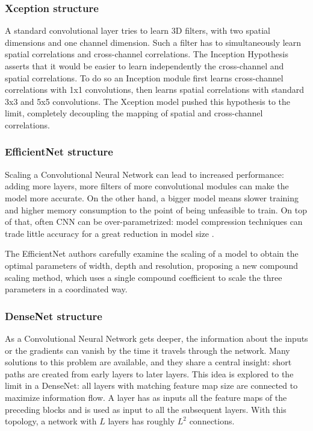 \subsubsection{Xception structure}

A standard convolutional layer tries to learn 3D filters, with two spatial
dimensions and one channel dimension.
Such a filter has to simultaneously learn spatial correlations and
cross-channel correlations.
The Inception Hypothesis asserts that it would be easier to learn independently
the cross-channel and spatial correlations.
To do so an Inception module first learns cross-channel correlations with 1x1
convolutions, then learns spatial correlations with standard 3x3 and 5x5
convolutions.
The Xception model pushed this hypothesis to the limit, completely decoupling
the mapping of spatial and cross-channel correlations.

\subsubsection{EfficientNet structure}

Scaling a Convolutional Neural Network can lead to increased performance:
adding more layers, more filters of more convolutional modules can make the
model more accurate. On the other hand, a bigger model means slower training
and higher memory consumption to the point of being unfeasible to train.
On top of that, often CNN can be over-parametrized: model compression
techniques can trade little accuracy for a great reduction in model size
\cite{han2016deep}.

The EfficientNet authors carefully examine the scaling of a model to obtain the
optimal parameters of width, depth and resolution, proposing a new compound
scaling method, which uses a single compound coefficient to scale the three
parameters in a coordinated way.

\subsubsection{DenseNet structure}

As a Convolutional Neural Network gets deeper, the information about the inputs
or the gradients can vanish by the time it travels through the network.
Many solutions to this problem are available, and they share a central insight:
short paths are created from early layers to later layers.
This idea is explored to the limit in a DenseNet: all layers with matching feature
map size are connected to maximize information flow.
A layer has as inputs all the feature maps of the preceding blocks and is used
as input to all the subsequent layers.
With this topology, a network with $L$ layers has roughly $L^2$ connections.

